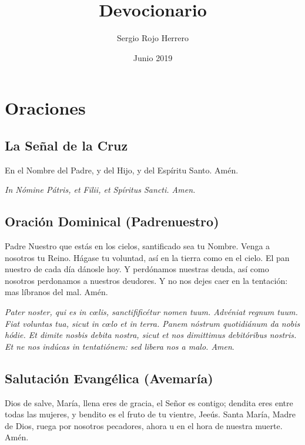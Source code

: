 \documentclass[a4paper,11pt, oneside]{report}
\title{Devocionario}
\author{Sergio Rojo Herrero}
\date{Junio 2019}
\begin{document}
  
  \begin{titlepage}
    \maketitle    
  \end{titlepage}

  \tableofcontents{}

  \newpage

  \chapter{Oraciones}

    \section{La Señal de la Cruz}
      En el Nombre del Padre, y del Hijo, y del Espíritu Santo. Amén.

      \medskip

      \textit{In Nómine Pátris, et Filii, et Spíritus Sancti. Amen.}\cite{frater:oraciones}

    \section{Oración Dominical (Padrenuestro)}
      
      Padre Nuestro que estás en los cielos, santificado sea tu Nombre. Venga a nosotros tu Reino. Hágase tu voluntad, así en la tierra como
      en el cielo. El pan nuestro de cada día dánosle hoy. Y perdónamos nuestras deuda, así como nosotros perdonamos a nuestros deudores.
      Y no nos dejes caer en la tentación: mas líbranos del mal. Amén.
      
      \medskip

      \textit{Pater noster, qui es in c{\oe}lis, sanctifificétur nomen tuum. Advéniat regnum tuum. Fiat voluntas tua, sicut in c{\oe}lo et in terra.
      Panem nóstrum quotidiánum da nobis hódie. Et dimite nosbis debita nostra, sicut et nos dimittimus debitóribus nostris. Et ne nos indúcas
      in tentatiónem: sed libera nos a malo. Amen}.\cite{frater:oraciones}

    \section{Salutación Evangélica (Avemaría)}
      Dios de salve, María, llena eres de gracia, el Señor es contigo; dendita eres entre todas las mujeres, y bendito es el fruto de tu
      vientre, Jeeús. Santa María, Madre de Dios, ruega por nosotros pecadores, ahora u en el hora de nuestra muerte. Amén.
      
\end{document}
